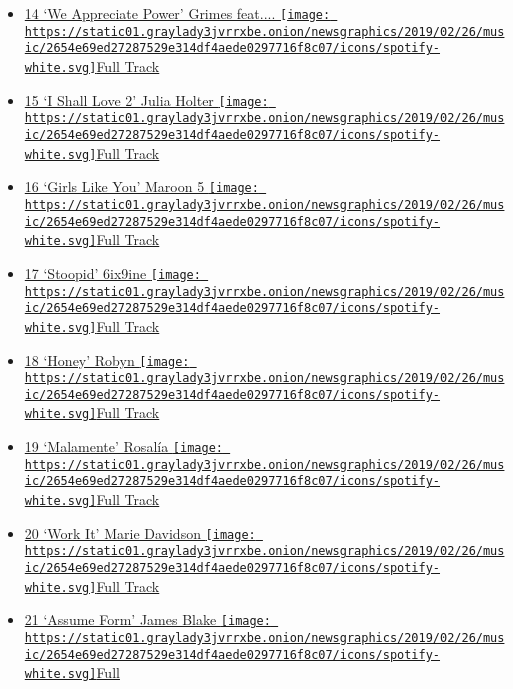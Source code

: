 \begin{itemize}
{  Track}
\item
  \protect\hyperlink{ux2fgrimes-feat-hana}{14 `We Appreciate Power'
  Grimes feat.... }
  \href{https://open.spotify.com/track/08ZCgkLKpcgrcSPCHN2v8J}{\texttt{[image: https://static01.graylady3jvrrxbe.onion/newsgraphics/2019/02/26/music/2654e69ed27287529e314df4aede0297716f8c07/icons/spotify-white.svg]}Full
  Track}
\item
  \protect\hyperlink{ux2fjulia-holter}{15 `I Shall Love 2' Julia Holter
  }
  \href{https://open.spotify.com/track/4VxGlr9PawFDaThx20USnS}{\texttt{[image: https://static01.graylady3jvrrxbe.onion/newsgraphics/2019/02/26/music/2654e69ed27287529e314df4aede0297716f8c07/icons/spotify-white.svg]}Full
  Track}
\item
  \protect\hyperlink{ux2fmaroon-5}{16 `Girls Like You' Maroon 5 }
  \href{https://open.spotify.com/track/6FRLCMO5TUHTexlWo8ym1W}{\texttt{[image: https://static01.graylady3jvrrxbe.onion/newsgraphics/2019/02/26/music/2654e69ed27287529e314df4aede0297716f8c07/icons/spotify-white.svg]}Full
  Track}
\item
  \protect\hyperlink{ux2fx6ix9ine}{17 `Stoopid' 6ix9ine }
  \href{https://open.spotify.com/track/6k2iq1yULhXILe0i8xQqPF}{\texttt{[image: https://static01.graylady3jvrrxbe.onion/newsgraphics/2019/02/26/music/2654e69ed27287529e314df4aede0297716f8c07/icons/spotify-white.svg]}Full
  Track}
\item
  \protect\hyperlink{ux2frobyn}{18 `Honey' Robyn }
  \href{https://open.spotify.com/track/3olYZQTYOLYNImERBnZZqm}{\texttt{[image: https://static01.graylady3jvrrxbe.onion/newsgraphics/2019/02/26/music/2654e69ed27287529e314df4aede0297716f8c07/icons/spotify-white.svg]}Full
  Track}
\item
  \protect\hyperlink{ux2frosala}{19 `Malamente' Rosalía }
  \href{https://open.spotify.com/track/1B0BQaSRHxhI0AUlItY3LK}{\texttt{[image: https://static01.graylady3jvrrxbe.onion/newsgraphics/2019/02/26/music/2654e69ed27287529e314df4aede0297716f8c07/icons/spotify-white.svg]}Full
  Track}
\item
  \protect\hyperlink{ux2fmarie-davidson}{20 `Work It' Marie Davidson }
  \href{https://open.spotify.com/track/5QnzAZ2W3Ap3gSiO2vsGQG}{\texttt{[image: https://static01.graylady3jvrrxbe.onion/newsgraphics/2019/02/26/music/2654e69ed27287529e314df4aede0297716f8c07/icons/spotify-white.svg]}Full
  Track}
\item
  \protect\hyperlink{ux2fjames-blake}{21 `Assume Form' James Blake }
  \href{https://open.spotify.com/track/6cJrQc34txUzXd90xWEAOh}{\texttt{[image: https://static01.graylady3jvrrxbe.onion/newsgraphics/2019/02/26/music/2654e69ed27287529e314df4aede0297716f8c07/icons/spotify-white.svg]}Full
}
\end{itemize}
